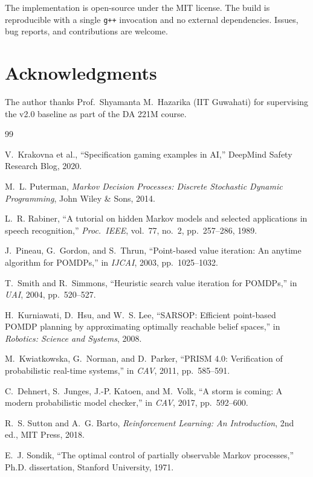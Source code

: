\documentclass[conference]{IEEEtran}
\begin{document}
The implementation is open-source under the MIT license. The build
is reproducible with a single \texttt{g++} invocation and no
external dependencies. Issues, bug reports, and contributions are
welcome.

\section*{Acknowledgments}

The author thanks Prof.\ Shyamanta M.\ Hazarika (IIT Guwahati) for
supervising the v2.0 baseline as part of the DA 221M course.

\begin{thebibliography}{99}

V.~Krakovna et al., ``Specification gaming examples in AI,''
DeepMind Safety Research Blog, 2020.

M.~L. Puterman, \emph{Markov Decision Processes: Discrete
Stochastic Dynamic Programming}, John Wiley \& Sons, 2014.

L.~R. Rabiner, ``A tutorial on hidden Markov models and selected
applications in speech recognition,'' \emph{Proc.\ IEEE}, vol.\ 77,
no.\ 2, pp.\ 257--286, 1989.

J.~Pineau, G.~Gordon, and S.~Thrun, ``Point-based value iteration:
An anytime algorithm for POMDPs,'' in \emph{IJCAI}, 2003,
pp.\ 1025--1032.

T.~Smith and R.~Simmons, ``Heuristic search value iteration for
POMDPs,'' in \emph{UAI}, 2004, pp.\ 520--527.

H.~Kurniawati, D.~Hsu, and W.~S. Lee, ``SARSOP: Efficient
point-based POMDP planning by approximating optimally reachable
belief spaces,'' in \emph{Robotics: Science and Systems}, 2008.

M.~Kwiatkowska, G.~Norman, and D.~Parker, ``PRISM 4.0: Verification
of probabilistic real-time systems,'' in \emph{CAV}, 2011,
pp.\ 585--591.

C.~Dehnert, S.~Junges, J.-P. Katoen, and M.~Volk, ``A storm is
coming: A modern probabilistic model checker,'' in \emph{CAV},
2017, pp.\ 592--600.

R.~S. Sutton and A.~G. Barto, \emph{Reinforcement Learning: An
Introduction}, 2nd ed., MIT Press, 2018.

E.~J. Sondik, ``The optimal control of partially observable Markov
processes,'' Ph.D. dissertation, Stanford University, 1971.

\end{thebibliography}
\end{document}
